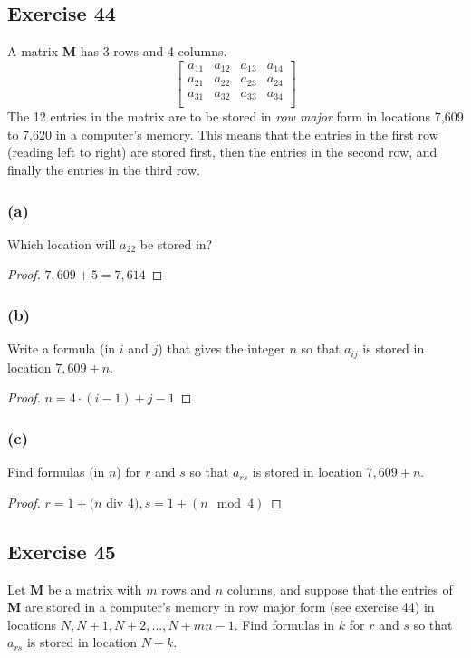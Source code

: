 \documentclass[14pt]{extarticle}
\begin{document}
\subsection{Exercise 44}
A matrix {\bf M} has 3 rows and 4 columns.
\[
    \left[
        \begin{array}{cccc}
            a_{11} & a_{12} & a_{13} & a_{14} \\
            a_{21} & a_{22} & a_{23} & a_{24} \\
            a_{31} & a_{32} & a_{33} & a_{34} \\
        \end{array}
        \right]
\]
The 12 entries in the matrix are to be stored in {\it row major} form in locations 7,609 to 7,620 in a computer’s memory. This means that the entries in the first row (reading left to right) are stored first, then the entries in the second row, and finally the entries in the third row.

\subsubsection{(a)}
Which location will $a_{22}$ be stored in?

\begin{proof}
    $7,609 + 5 = 7,614$
\end{proof}

\subsubsection{(b)}
Write a formula (in $i$ and $j$) that gives the integer $n$ so that $a_{ij}$ is stored in location $7,609 + n$.

\begin{proof}
    $n = 4\cdot (i-1) + j - 1$
\end{proof}

\subsubsection{(c)}
Find formulas (in $n$) for $r$ and $s$ so that $a_{rs}$ is stored in location $7,609 + n$.

\begin{proof}
    $r = 1 + (n$ div $4), s = 1 + (n \mod 4)$
\end{proof}

\subsection{Exercise 45}
Let {\bf M} be a matrix with $m$ rows and $n$ columns, and suppose that the entries of {\bf M} are stored in a computer’s memory in row major form (see exercise 44) in locations $N, N + 1, N + 2, \ldots, N + mn - 1$. Find formulas in $k$ for $r$ and $s$ so that $a_{rs}$ is stored in location $N + k$.
\end{document}
